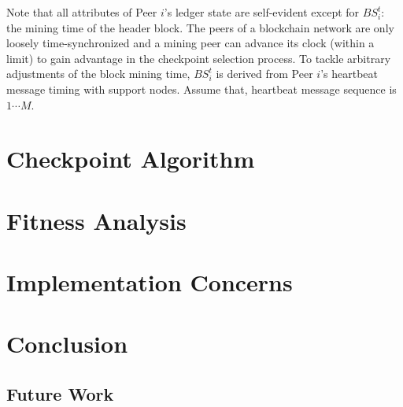 \documentclass[conference]{IEEEtran}
\begin{document}
Note that all attributes of Peer $i$'s ledger state are self-evident except for $BS_i^t$: the mining time of the header block. The peers of a blockchain network are only loosely time-synchronized and a mining peer can advance its clock (within a limit) to gain advantage in the checkpoint selection process. To tackle arbitrary adjustments of the block mining time, $BS_i^t$ is derived from Peer $i$'s heartbeat message timing with support nodes. Assume that, heartbeat message sequence is $1 \cdots M$.                   

\section{Checkpoint Algorithm}
\label{s-algorithm}

\section{Fitness Analysis}
\label{s-analysis}

\section{Implementation Concerns}
\label{s-implementation}

\section{Conclusion}
\label{s-conclusion}
\subsection{Future Work}
 


\end{document}
